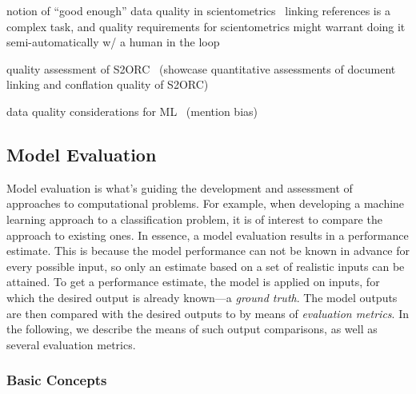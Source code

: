 



notion of ``good enough'' data quality in scientometrics~\cite{Strotmann2015}
linking references is a complex task, and quality requirements for scientometrics might warrant doing it semi-automatically w/ a human in the loop~\cite{Lauscher2018}

quality assessment of S2ORC~\cite{Wu2022doceng} (showcase quantitative assessments of document linking and conflation quality of S2ORC)

data quality considerations for ML~\cite{Gudivada2017} (mention bias)

\subsection{Model Evaluation}

Model evaluation is what's guiding the development and assessment of approaches to computational problems. For example, when developing a machine learning approach to a classification problem, it is of interest to compare the approach to existing ones. In essence, a model evaluation results in a performance estimate. This is because the model performance can not be known in advance for every possible input, so only an estimate based on a set of realistic inputs can be attained.
To get a performance estimate, the model is applied on inputs, for which the desired output is already known---a \emph{ground truth}. The model outputs are then compared with the desired outputs to by means of \emph{evaluation metrics}. In the following, we describe the means of such output comparisons, as well as several evaluation metrics.

\subsubsection{Basic Concepts}

